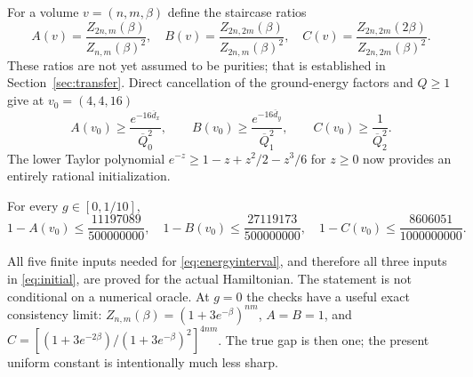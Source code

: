 For a volume $v=(n,m,\beta)$ define the staircase ratios
\begin{equation}\label{eq:staircase}
 A(v)=\frac{Z_{2n,m}(\beta)}{Z_{n,m}(\beta)^2},\quad
 B(v)=\frac{Z_{2n,2m}(\beta)}{Z_{2n,m}(\beta)^2},\quad
 C(v)=\frac{Z_{2n,2m}(2\beta)}{Z_{2n,2m}(\beta)^2}.
\end{equation}
These ratios are not yet assumed to be purities; that is established in
Section~\ref{sec:transfer}. Direct cancellation of the ground-energy factors
and $Q\ge1$ give at $v_0=(4,4,16)$
\[
 A(v_0)\ge\frac{e^{-16\overline d_x}}{\overline Q_0^2},\qquad
 B(v_0)\ge\frac{e^{-16\overline d_y}}{\overline Q_1^2},\qquad
 C(v_0)\ge\frac1{\overline Q_2^2}.
\]
The lower Taylor polynomial $e^{-z}\ge1-z+z^2/2-z^3/6$ for $z\ge0$ now
provides an entirely rational initialization.
\begin{proposition}\label{prop:seed}
For every $g\in[0,1/10]$,
\begin{equation}\label{eq:initial}
 1-A(v_0)\le\frac{11197089}{500000000},\quad
 1-B(v_0)\le\frac{27119173}{500000000},\quad
 1-C(v_0)\le\frac{8606051}{1000000000}.
\end{equation}
\end{proposition}
All five finite inputs needed for \eqref{eq:energyinterval}, and therefore all
three inputs in \eqref{eq:initial}, are proved for the actual Hamiltonian.
The statement is not conditional on a numerical oracle.
At $g=0$ the checks have a useful exact consistency limit:
$Z_{n,m}(\beta)=(1+3e^{-\beta})^{nm}$, $A=B=1$, and
$C=[(1+3e^{-2\beta})/(1+3e^{-\beta})^2]^{4nm}$.
The true gap is then one; the present uniform constant is intentionally much
less sharp.
